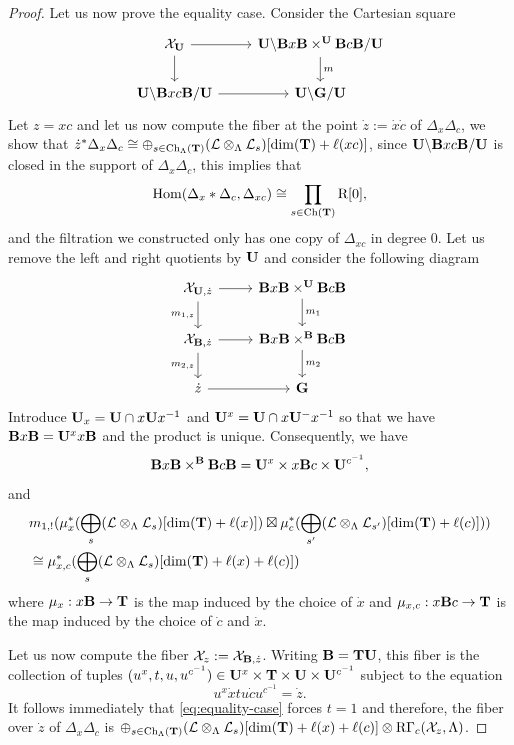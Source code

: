 \documentclass[article, 10pt, oneside, reqno]{amsart}
\theoremstyle{plain}
\theoremstyle{definition}
\theoremstyle{remark}
\begin{document}
\begin{proof}
Let us now prove the equality case. Consider the Cartesian square 
\[\begin{tikzcd}
	\Xcal_{\Ubf} & {\Ubf\backslash\Bbf x\Bbf \times^{\Ubf} \Bbf c\Bbf/\Ubf} \\
	{\Ubf\backslash\Bbf xc\Bbf/\Ubf} & {\Ubf\backslash\Gbf/\Ubf}
	\arrow[from=1-1, to=1-2]
	\arrow[from=1-1, to=2-1]
	\arrow["m", from=1-2, to=2-2]
	\arrow[from=2-1, to=2-2]
\end{tikzcd}\]
Let $z = xc$ and let us now compute the fiber at the point $\dot{z} := \dot{x}\dot{c}$ of $\Delta_x\Delta_c$, we show that $\dot{z}^*\Delta_x\Delta_c \cong \oplus_{s\in\mathrm{Ch}_{\Lambda}(\mathbf{T})} (\mathcal{L} \otimes_{\Lambda} \mathcal{L}_s) [\dim(\mathbf{T}) + \ell(xc)]$, since $\mathbf{U}\backslash\mathbf{B} xc\mathbf{B}/\mathbf{U}$ is closed in the support of $\Delta_x\Delta_c$, this implies that 
$$\mathrm{Hom}(\Delta_x * \Delta_c, \Delta_{xc}) \cong \prod_{s \in \mathrm{Ch}(\mathbf{T})}\mathrm{R}[0],$$
and the filtration we constructed only has one copy of $\Delta_{xc}$ in degree $0$. Let us remove the left and right quotients by $\mathbf{U}$ and consider the following diagram 
\[\begin{tikzcd}
	{\Xcal_{\Ubf, \dot{z}}} & {\Bbf x\Bbf \times^{\Ubf} \Bbf c \Bbf} \\
	{\Xcal_{\Bbf, \dot{z}}} & {\Bbf x\Bbf \times^{\Bbf} \Bbf c \Bbf} \\
	{\dot{z}} & \Gbf
	\arrow[from=1-1, to=1-2]
	\arrow["{m_{1,z}}"', from=1-1, to=2-1]
	\arrow["{m_1}", from=1-2, to=2-2]
	\arrow[from=2-1, to=2-2]
	\arrow["{m_{2,z}}"', from=2-1, to=3-1]
	\arrow["{m_2}", from=2-2, to=3-2]
	\arrow[from=3-1, to=3-2]
\end{tikzcd}\]
Introduce $\mathbf{U}_x = \mathbf{U} \cap x\mathbf{U} x^{-1}$ and $\mathbf{U}^{x} =  \mathbf{U} \cap x\mathbf{U}^- x^{-1}$ so that we have $\mathbf{B} x\mathbf{B} = \mathbf{U}^x x\mathbf{B}$ and the product is unique. Consequently, we have 
$$\mathbf{B} x\mathbf{B} \times^{\mathbf{B}} \mathbf{B} c \mathbf{B} = \mathbf{U}^x \times x\mathbf{B} c \times \mathbf{U}^{c^{-1}},$$
and 
\begin{align*}
&m_{1,!}(\mu_x^*(\bigoplus_{s} (\mathcal{L} \otimes_{\Lambda} \mathcal{L}_s)[\dim (\mathbf{T}) + \ell(x)]) \boxtimes  \mu_c^*(\bigoplus_{s'} (\mathcal{L} \otimes_{\Lambda} \mathcal{L}_{s'})[\dim (\mathbf{T}) + \ell(c)])) \\
&\cong \mu_{x,c}^*(\bigoplus_{s} (\mathcal{L} \otimes_{\Lambda} \mathcal{L}_s)[\dim (\mathbf{T}) + \ell(x) + \ell(c)])
\end{align*}
where $\mu_x : x\mathbf{B} \to \mathbf{T}$ is the map induced by the choice of $\dot{x}$ and $\mu_{x,c} : x\mathbf{B} c \to \mathbf{T}$ is the map induced by the choice of $\dot{c}$ and $\dot{x}$.

Let us now compute the fiber $\mathcal{X}_z := \mathcal{X}_{\mathbf{B},\dot{z}}$. Writing $\mathbf{B} = \mathbf{T}\mathbf{U}$, this fiber is the collection of tuples $(u^x, t, u, u^{c^{-1}}) \in \mathbf{U}^x \times \mathbf{T} \times \mathbf{U} \times \mathbf{U}^{c^{-1}}$ subject to the equation
\begin{equation}\label{eq:equality-case}
u^x \dot{x} t u \dot{c} u^{c^{-1}} = \dot{z}.
\end{equation} 
It follows immediately that \eqref{eq:equality-case} forces $t = 1$ and therefore, the fiber over $\dot{z}$ of $\Delta_x\Delta_c$ is $\oplus_{s\in\mathrm{Ch}_{\Lambda}(\mathbf{T})} (\mathcal{L} \otimes_{\Lambda} \mathcal{L}_s) [\dim(\mathbf{T}) + \ell(x) + \ell(c)] \otimes \mathrm{R\Gamma}_c(\mathcal{X}_z, \Lambda)$. 


\end{proof}
\end{document}
